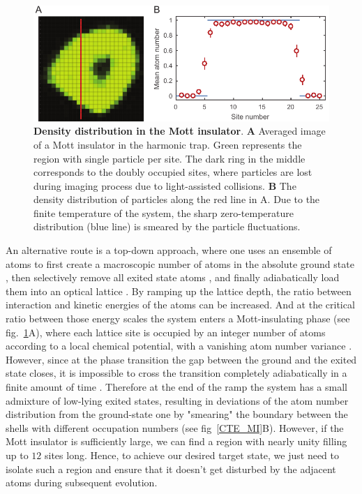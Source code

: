 \begin{figure}[t]
	\centering
	\includegraphics[scale=1]{figures/CTE_MI.pdf}
	\caption{{\bf Density distribution in the Mott insulator}. {\bf A} Averaged image of a Mott insulator in the harmonic trap. Green represents the region with single particle per site. The dark ring in the middle corresponds to the doubly occupied sites, where particles are lost during imaging process due to light-assisted collisions. {\bf B} The density distribution of particles along the red line in A. Due to the finite temperature of the system, the sharp zero-temperature distribution (blue line) is smeared by the particle fluctuations.}
	\label{fig:CTE_MI}
\end{figure}

An alternative route is a top-down approach, where one uses an ensemble of atoms to first create a macroscopic number of atoms in the absolute ground state \cite{BEC, DFG}, then selectively remove all exited state atoms \cite{ammy's thesis}, and finally adiabatically load them into an optical lattice \cite{Greiner2002}. By ramping up the lattice depth, the ratio between interaction and kinetic energies of the atoms can be increased. And at the critical ratio between those energy scales the system enters a Mott-insulating phase (see fig.~\ref{fig:CTE_MI}A), where each lattice site is occupied by an integer number of atoms according to a local chemical potential, with a vanishing atom number variance \cite{Bakr2010, Bloch MI}. However, since at the phase transition the gap between the ground and the exited state closes, it is impossible to cross the transition completely adiabatically in a finite amount of time \cite{subir phase transition}. Therefore at the end of the ramp the system has a small admixture of low-lying exited states, resulting in  deviations of the atom number distribution from the ground-state one by "smearing" the boundary between the shells with different occupation numbers (see fig~\ref{CTE_MI}B). However, if the Mott insulator is sufficiently large, we can find a region with nearly unity filling up to $12$ sites long. Hence, to achieve our desired target state, we just need to isolate such a region and ensure that it doesn't get disturbed by the adjacent atoms during subsequent evolution.

